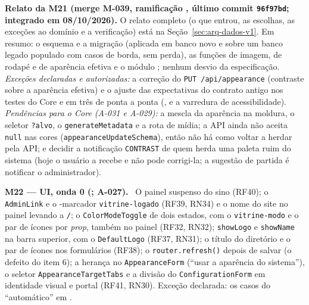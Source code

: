 \textbf{Relato da M21 (merge M-039, ramificação , último commit \texttt{96f97bd}; integrado em 08/10/2026).} O relato completo (o que entrou, as escolhas, as exceções ao domínio e a verificação) está na Seção~\ref{sec:arq-dados-v1}. Em resumo: o esquema e a migração  (aplicada em banco novo e sobre um banco legado populado com casos de borda, sem perda), as funções de imagem, de rodapé e de aparência efetiva e o módulo ; nenhum desvio da especificação. \emph{Exceções declaradas e autorizadas:} a correção do \texttt{PUT /api/appearance} (contraste sobre a aparência efetiva) e o ajuste das expectativas do contrato antigo nos testes do Core e em três  de ponta a ponta (,  e a varredura de acessibilidade). \emph{Pendências para o Core (A-031 e A-029):} a mescla da aparência na moldura, o seletor \texttt{?alvo}, o \texttt{generateMetadata} e a rota de mídia; a API ainda não aceita \texttt{null} nas cores (\texttt{appearanceUpdateSchema}), então não há como voltar a herdar pela API; e decidir a notificação \texttt{CONTRAST} de quem herda uma paleta ruim do sistema (hoje o usuário a recebe e não pode corrigi-la; a sugestão de partida é notificar o administrador).

\textbf{M22 --- UI, onda 0 (; A-027).} \ O painel suspenso do sino (RF40); o \texttt{AdminLink} e o -marcador \texttt{vitrine-logado} (RF39, RN34) e o nome do site no painel levando a \texttt{/}; o \texttt{ColorModeToggle} de dois estados, com o  \texttt{vitrine-modo} e o par de ícones por \emph{prop}, também no painel (RF32, RN32); \texttt{showLogo} e \texttt{showName} na barra superior, com o \texttt{DefaultLogo} (RF37, RN31); o título do diretório e o par de ícones nos formulários (RF38); o \texttt{router.refresh()} depois de salvar (o defeito do item 6); a herança no \texttt{AppearanceForm} (``usar a aparência do sistema''), o seletor \texttt{AppearanceTargetTabs} e a divisão do \texttt{ConfigurationForm} em identidade visual e portal (RF41, RN30). Exceção declarada: os casos do ``automático'' em .

